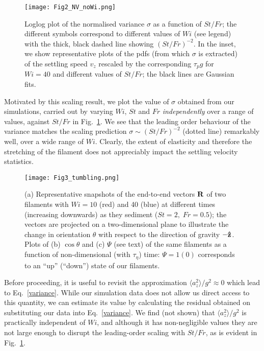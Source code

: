 \documentclass[aps,prl,twocolumn,superscriptaddress,floatfix,tightenlines,showpacs,notitlepage]{revtex4-1}
\begin{document}
\begin{figure}
\texttt{[image: Fig2\_NV\_noWi.png]}
	\caption{Loglog plot of the normalised variance $\sigma$ as a function of $St/Fr$; the different symbols correspond 
	to different values of $Wi$ (see legend) with the thick, black dashed line showing $(St/Fr)^{-2}$. In the inset, 
	we show representative plots of the pdfs (from which $\sigma$ is extracted) of the 
	settling speed $v_z$ rescaled by the corresponding $\tau_pg$  for $Wi = 40$ and different 
	values of $St/Fr$; the black lines are Gaussian fits.}
\label{pdf}
\end{figure}

Motivated by this scaling result, we plot the value of $\sigma$ obtained from our simulations, carried out by varying $Wi$, $St$ and $Fr$ \textit{independently} over a range of values, against $St/Fr$ in Fig.~\ref{pdf}.  We see that the leading order behaviour of the variance matches the scaling prediction $\sigma \sim (St/Fr)^{-2}$ (dotted line) remarkably well, over a wide range of $Wi$. Clearly, the extent of elasticity and therefore the stretching of the filament does not appreciably impact the settling velocity statistics. 

\begin{figure}
\texttt{[image: Fig3\_tumbling.png]}
	\caption{(a) Representative snapshots of the end-to-end vectors ${\bf R}$ of two filaments with $Wi = 10$ (red) and 40 (blue) 
	at different times (increasing downwards) as they sediment ($St =2,\; Fr = 0.5$); the vectors are projected on a two-dimensional plane 
	to illustrate the change in orientation $\theta$ with respect to the direction of gravity $-{\bf \hat z}$. Plots of 
	(b) $\cos\theta$ and (c) $\Psi$ (see text) of the same filaments 
	as a function of non-dimensional (with $\tau_\eta$) time: $\Psi = 1 (0)$ corresponds to an ``up'' (``down'') state of our filaments.}
\label{costheta}
\end{figure}

Before proceeding, it is useful to revisit the
approximation $\langle a_z^2 \rangle/g^2 \approx 0$ which lead to Eq.~\eqref{variance}. While our simulation data does not allow us direct access to this quantity, we can estimate its value by calculating the residual obtained on substituting our data into Eq.~\eqref{variance}. We find (not shown) that $\langle a_z^2 \rangle/g^2$ is practically independent of $Wi$, and although it has non-negligible values they are not large enough to disrupt the leading-order scaling with $St/Fr$, as is evident in Fig.~\ref{pdf}.
\end{document}
